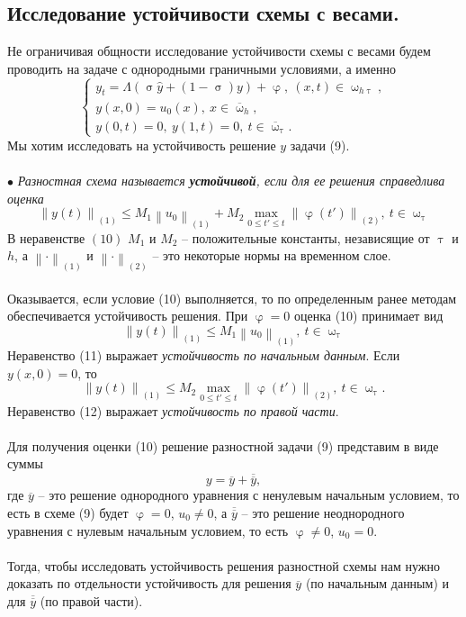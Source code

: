 \documentclass[a4paper, 12pt]{report}
\numberwithin{equation}{section}
\newcommand{\ol}{\overline}
\renewcommand{\leq}{\leqslant}
\renewcommand{\varphi}{\upvarphi}
\renewcommand{\phi}{\upvarphi}
\renewcommand{\tau}{\uptau}
\renewcommand{\sigma}{\upsigma}
\renewcommand{\omega}{\upomega}
\newcommand\Norm[1]{\left\| #1 \right\|}
\begin{document}
		\subsection{Исследование устойчивости схемы с весами.}
		Не ограничивая общности исследование устойчивости схемы с весами будем проводить на задаче с однородными граничными условиями, а именно
		\begin{equation}
			\begin{cases}
				y_t = \Lambda(\sigma \hat y + (1-\sigma)y)+\varphi,\ (x,t)\in \omega_{h\tau},\\
				y(x,0) = u_0(x),\ x \in \ol \omega_h,\\
				y(0, t) = 0,\ y(1,t) = 0,\ t \in \ol \omega_\tau.
			\end{cases}
		\end{equation}
		Мы хотим исследовать на устойчивость решение $y$ задачи (9). \\\\
		$\bullet$ \textit{Разностная схема называется \textbf{устойчивой}, если для ее решения справедлива оценка}
		\begin{equation}
			\Norm{y(t)}_{(1)}\leq M_1 \Norm{u_0}_{(1)} + M_2 \underset{0 \leq t' \leq t}{\max}\Norm{\varphi(t')}_{(2)},\ t \in \omega_\tau
		\end{equation}
		В неравенстве $(10)$ $M_1$ и $M_2$ -- положительные константы, независящие от $\tau$ и $h$, а $\Norm{\cdot}_{(1)}$ и $\Norm{\cdot}_{(2)}$ -- это некоторые нормы на временном слое. \\\\
		Оказывается, если условие (10) выполняется, то по определенным ранее методам обеспечивается устойчивость решения. При $\varphi = 0$ оценка (10) принимает вид
		\begin{equation}
			\Norm{y(t)}_{(1)}\leq M_1 \Norm{u_0}_{(1)},\ t \in \omega_\tau
		\end{equation}
		Неравенство (11) выражает \textit{устойчивость по начальным данным}. Если $y(x,0) = 0$, то \begin{equation}
			\Norm{y(t)}_{(1)}\leq M_2 \underset{0 \leq t' \leq t}{\max}\Norm{\varphi(t')}_{(2)},\ t \in \omega_\tau.
		\end{equation}
		Неравенство (12) выражает \textit{устойчивость по правой части}.
		\\\\
		Для получения оценки (10) решение разностной задачи (9) представим в виде суммы
		\begin{equation*}
			y = \ol y + \ol{\ol y}, 
		\end{equation*}
		где $\ol y$ -- это решение однородного уравнения с ненулевым начальным условием, то есть в схеме (9) будет $\phi = 0$, $u_0 \ne 0$, а $\ol{\ol y}$ -- это решение неоднородного уравнения с нулевым начальным условием, то есть $\phi \ne 0$, $u_0 = 0$.
		\\\\
		Тогда, чтобы исследовать устойчивость решения разностной схемы нам нужно доказать по отдельности устойчивость для решения $\ol y$ (по начальным данным) и для $\ol{\ol y}$ (по правой части). 
\end{document}
